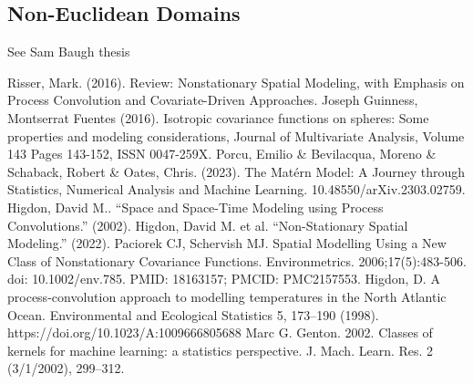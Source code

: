 \documentclass[12pt]{article}
\begin{document}
\subsection{Non-Euclidean Domains}
See Sam Baugh thesis


\begin{thebibliography}{20}
 Risser, Mark. (2016). Review: Nonstationary Spatial Modeling, with Emphasis on Process Convolution and Covariate-Driven Approaches. 
 Joseph Guinness, Montserrat Fuentes (2016). Isotropic covariance functions on spheres: Some properties and modeling considerations, Journal of Multivariate Analysis, Volume 143
Pages 143-152, ISSN 0047-259X.
 Porcu, Emilio \& Bevilacqua, Moreno \& Schaback, Robert \& Oates, Chris. (2023). The Mat\'ern Model: A Journey through Statistics, Numerical Analysis and Machine Learning. 10.48550/arXiv.2303.02759. 
 Higdon, David M.. “Space and Space-Time Modeling using Process Convolutions.” (2002).
 Higdon, David M. et al. “Non-Stationary Spatial Modeling.” (2022).
 Paciorek CJ, Schervish MJ. Spatial Modelling Using a New Class of Nonstationary Covariance Functions. Environmetrics. 2006;17(5):483-506. doi: 10.1002/env.785. PMID: 18163157; PMCID: PMC2157553.
 Higdon, D. A process-convolution approach to modelling temperatures in the North Atlantic Ocean. Environmental and Ecological Statistics 5, 173–190 (1998). https://doi.org/10.1023/A:1009666805688
 Marc G. Genton. 2002. Classes of kernels for machine learning: a statistics perspective. J. Mach. Learn. Res. 2 (3/1/2002), 299–312.
\bibitem{} 
\end{thebibliography}
\end{document}
